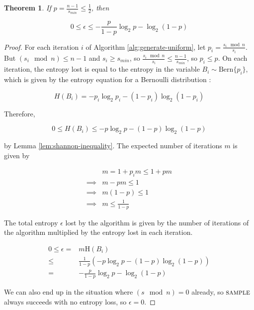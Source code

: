 \documentclass[12pt]{article}
\newtheorem{theorem}{Theorem}
\newcommand{\bern}[1]{\mathrm{Bern}\{#1\}}
\newcommand{\entropy}[1]{\mathrm{H}(#1)}
\begin{document}
\begin{theorem}
    \label{thm:loss}
If $p = \frac{n-1}{s_{min}} \le \frac{1}{2}$, then

\begin{equation}
0 \le \epsilon \le -\frac{p}{1-p}\log_2p - \log_2(1-p)
\end{equation}

\end{theorem}

\begin{proof}
For each iteration $i$ of Algorithm \ref{alg:generate-uniform}, let $p_i = \frac{s_i \mod n}{s_i}$. But $(s_i \mod n) \le n-1$ and $s_i \ge s_{min}$, so $\frac{s_i \mod n}{s_i} \le \frac{n-1}{s_{min}}$, so $p_i \le p$. On each iteration, the entropy lost is equal to the entropy in the variable $B_i \sim \bern{p_i}$, which is given by the entropy equation for a Bernoulli distribution \cite{cover1999elements}:

\begin{equation}
H(B_i) = -p_i\log_2p_i - (1-p_i)\log_2(1-p_i)
\end{equation}

Therefore, 

\begin{equation}
0 \le H(B_i) \le -p\log_2p - (1-p)\log_2(1-p) 
\end{equation}

by Lemma \ref{lem:shannon-inequality}. The expected number of iterations $m$ is given by

\begin{align}
& m = 1 + p_im \le 1 + pm \\
\implies & m-pm \le 1 \\
\implies & m(1-p) \le 1 \\
\implies & m \le \frac{1}{1-p}
\end{align}

The total entropy $\epsilon$ lost by the algorithm is given by the number of iterations of the algorithm multiplied by the entropy lost in each iteration.

\begin{align}
0 \le \epsilon
    = & m\entropy{B_i} \\
    \le & \frac{1}{1-p}(-p\log_2p - (1-p)\log_2(1-p) ) \\
    = & -\frac{p}{1-p}\log_2p - \log_2(1-p)
\end{align}

We can also end up in the situation where $(s \mod n) = 0$ already, so $\textsc{sample}$ always succeeds with no entropy loss, so $\epsilon=0$.
\end{proof}
\end{document}
